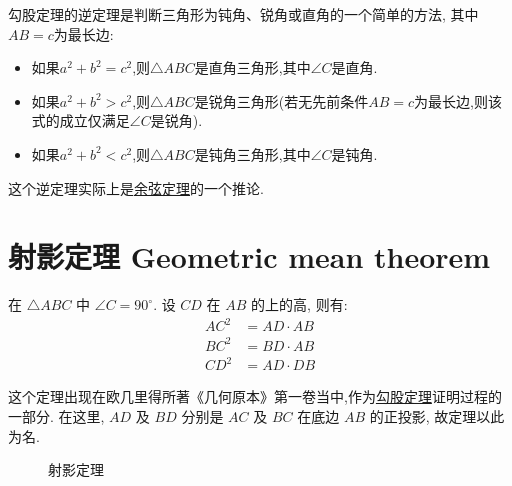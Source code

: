 \begin{theorem}[勾股定理的逆定理]
  勾股定理的逆定理是判断三角形为钝角、锐角或直角的一个简单的方法, 其中$AB=c$为最长边:
  \begin{itemize}
    \item 如果$a^2 + b^2 = c^2$,则$\triangle ABC$是直角三角形,其中$\angle C$是直角.
    \item 如果$a^2 + b^2 > c^2$,则$\triangle ABC$是锐角三角形(若无先前条件$AB=c$为最长边,则该式的成立仅满足$\angle C$是锐角).
    \item 如果$a^2 + b^2 < c^2$,则$\triangle ABC$是钝角三角形,其中$\angle C$是钝角.
  \end{itemize}
\end{theorem}

这个逆定理实际上是\hyperref[cosines]{余弦定理}的一个推论.

\section{射影定理 Geometric mean theorem}

\begin{theorem}
在 $\triangle{ABC}$ 中 $\angle C = 90^\circ$. 设 $CD$ 在 $AB$ 的上的高, 则有:
\begin{align*}
  {AC}^{2} &= AD \cdot AB \\
  {BC}^{2} &= BD \cdot AB \\
  {CD}^{2} &= AD \cdot DB
\end{align*}
\end{theorem}

这个定理出现在欧几里得所著《几何原本》第一卷当中,作为\hyperref[pythagorean]{勾股定理}证明过程的一部分.
在这里, $AD$ 及 $BD$ 分别是 $AC$ 及 $BC$ 在底边 $AB$ 的正投影, 故定理以此为名.

\begin{figure}[!htb]
\begin{center}
\end{center}
\caption{射影定理}
\end{figure}

